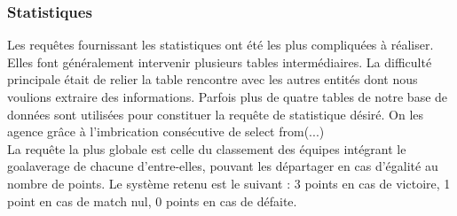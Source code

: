 \documentclass[a4paper,12pt]{article}
\begin{document}
\subsubsection{Statistiques}
Les requêtes fournissant les statistiques ont été les plus compliquées à réaliser. Elles font généralement intervenir plusieurs tables intermédiaires. La difficulté principale était de relier la table rencontre avec les autres entités dont nous voulions extraire des informations.
Parfois plus de quatre tables de notre base de données sont utilisées pour constituer la requête de statistique désiré. On les agence grâce à l'imbrication consécutive de select from(...)\\
La requête la plus globale est celle du classement des équipes intégrant le goalaverage de chacune d'entre-elles, pouvant les départager en cas d'égalité au nombre de points. Le système retenu est le suivant : 3 points en cas de victoire, 1 point en cas de match nul, 0 points en cas de défaite.
\end{document}
